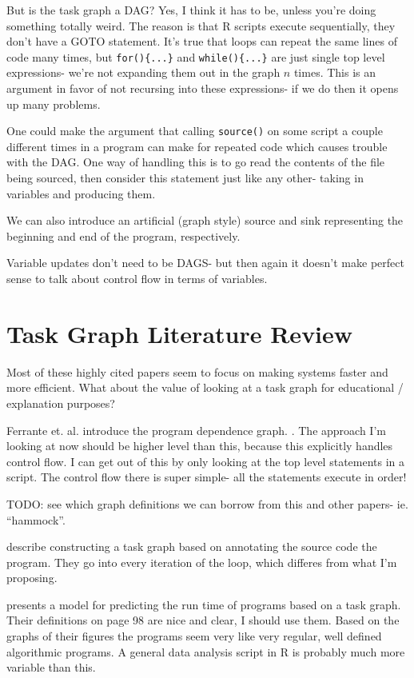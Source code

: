 \documentclass[12pt]{article}
\begin{document}
But is the task graph a DAG? Yes, I think it has to be, unless you're doing
something totally weird.  The reason is that R scripts execute
sequentially, they don't have a GOTO statement. It's true that loops can
repeat the same lines of code many times, but \texttt{for()\{...\}} and 
\texttt{while()\{...\}} are just single top level expressions- we're not
expanding them out in the graph $n$ times. This is an argument in favor of
not recursing into these expressions- if we do then it opens up many
problems. 

One could make the argument that calling \texttt{source()} on some script
a couple different times in a program can make for repeated code which
causes trouble with the DAG. One way of handling this is to go read the
contents of the file being sourced, then consider this statement just like
any other- taking in variables and producing them.

We can also introduce an artificial (graph style) source and sink representing the
beginning and end of the program, respectively.

Variable updates don't need to be DAGS- but then again it doesn't make
perfect sense to talk about control flow in terms of variables.

\section{Task Graph Literature Review}

Most of these highly cited papers seem to focus on making systems faster
and more efficient. What about the value of looking at a task graph for
educational / explanation purposes?

Ferrante et. al. introduce the program dependence graph.
\cite{ferrante1987}. The approach I'm looking at now should be higher level
than this, because this explicitly handles control flow. I can get out of
this by only looking at the top level statements in a script. The control
flow there is super simple- all the statements execute in order!

TODO: see which graph definitions we can borrow from this and other papers-
ie. ``hammock''.

\cite{cosnard1995automatic} describe constructing a task graph based on
annotating the source code the program. They go into every iteration of the
loop, which differes from what I'm proposing.

\cite{adve2004parallel} presents a model for predicting the run time of
programs based on a task graph. 
Their definitions on page 98 are nice and clear, I should use them.
Based on the graphs of their figures the
programs seem very like very regular, well defined algorithmic programs. A
general data analysis script in R is probably much more variable than this.
\end{document}
